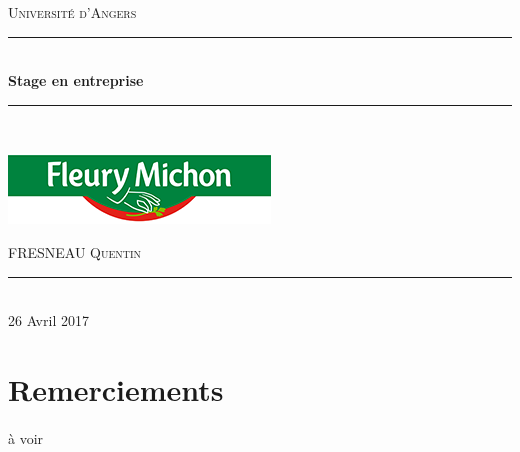 \documentclass[a4paper,12pt]{extarticle}
\newcommand{\HRule}{\rule{\linewidth}{0.5mm}}
\begin{document}
\begin{titlepage}
  \begin{sffamily}
  \begin{center}


    \textsc{\LARGE Université d'Angers}\\[2cm]

   

    \HRule \\[0.4cm]
    { \huge \bfseries Stage en entreprise}{\bfseries  \\[0.4cm] }

    \HRule \\[2cm]
    
	\begin{center}
		\includegraphics[scale=1]{Img/logo/logo_fleurymichon}
	\end{center}
    
    \begin{minipage}{0.4\textwidth}
      \begin{flushleft} \large
        FRESNEAU \textsc{Quentin}
      \end{flushleft}
    \end{minipage}
    

    \vfill
    \HRule\\[2cm]
    {\large 26 Avril 2017}

  \end{center}
  \end{sffamily}
\end{titlepage}
\clearpage

\tableofcontents

\clearpage

\section{Remerciements}

\paragraph{}
à voir\\
\end{document}

